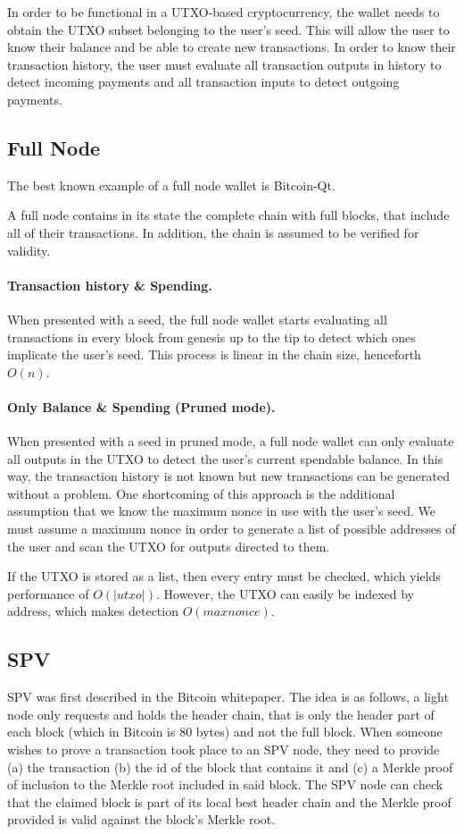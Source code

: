\documentclass[sigconf]{acmart}
\begin{document}
In order to be functional in a UTXO-based cryptocurrency, the wallet needs to obtain the UTXO subset belonging to the user's seed. This will allow the user to know their balance and be able to create new transactions. In order to know their transaction history, the user must evaluate all transaction outputs in history to detect incoming payments and all transaction inputs to detect outgoing payments.

\subsection{Full Node}
The best known example of a full node wallet is Bitcoin-Qt.

A full node contains in its state the complete chain with full blocks, that include all of their transactions. In addition, the chain is assumed to be verified for validity.

\paragraph{Transaction history \& Spending.}
When presented with a seed, the full node wallet starts evaluating all transactions in every block from genesis up to the tip to detect which ones implicate the user's seed. This process is linear in the chain size, henceforth $O(n)$.

\paragraph{Only Balance \& Spending (Pruned mode).}
When presented with a seed in pruned mode, a full node wallet can only evaluate all outputs in the UTXO to detect the user's current spendable balance. In this way, the transaction history is not known but new transactions can be generated without a problem. One shortcoming of this approach is the additional assumption that we know the maximum nonce in use with the user's seed. We must assume a maximum nonce in order to generate a list of possible addresses of the user and scan the UTXO for outputs directed to them.

If the UTXO is stored as a list, then every entry must be checked, which yields performance of $O(|utxo|)$. However, the UTXO can easily be indexed by address, which makes detection $O(maxnonce)$.
\subsection{SPV}
SPV was first described in the Bitcoin whitepaper.
The idea is as follows, a light node only requests and holds the header chain, that is only the header part of each block (which in Bitcoin is 80 bytes) and not the full block. When someone wishes to prove a transaction took place to an SPV node, they need to provide (a) the transaction (b) the id of the block that contains it and (c) a Merkle proof of inclusion to the Merkle root included in said block. The SPV node can check that the claimed block is part of its local best header chain and the Merkle proof provided is valid against the block's Merkle root.
\end{document}
